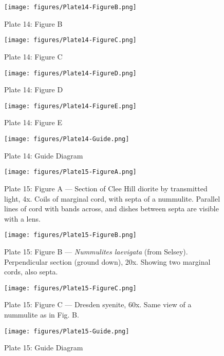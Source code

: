 \documentclass[a4paper, 12pt, oneside]{article}
\begin{document}
\clearpage
\begin{figure}[b]
\centering
\texttt{[image: figures/Plate14-FigureB.png]}
\caption{\small Plate 14: Figure B}
\end{figure}
\clearpage
\begin{figure}[b]
\centering
\texttt{[image: figures/Plate14-FigureC.png]}
\caption{\small Plate 14: Figure C}
\end{figure}
\clearpage
\begin{figure}[b]
\centering
\texttt{[image: figures/Plate14-FigureD.png]}
\caption{\small Plate 14: Figure D}
\end{figure}
\clearpage
\begin{figure}[b]
\centering
\texttt{[image: figures/Plate14-FigureE.png]}
\caption{\small Plate 14: Figure E}
\end{figure}
\clearpage
\begin{figure}[b]
\centering
\texttt{[image: figures/Plate14-Guide.png]}
\caption{\small Plate 14: Guide Diagram}
\end{figure}
\clearpage
{}
\cfoot{\thepage}
\begin{figure}[b]
\centering
\texttt{[image: figures/Plate15-FigureA.png]}
\caption{\small Plate 15: Figure A --- Section of Clee Hill diorite by transmitted light, 4x. Coils of marginal cord, with septa of a nummulite. Parallel lines of cord with bands across, and dishes between septa are visible with a lens.}
\end{figure}
\clearpage
\begin{figure}[b]
\centering
\texttt{[image: figures/Plate15-FigureB.png]}
\caption{\small Plate 15: Figure B --- \emph{Nummulites laevigata} (from Selsey). Perpendicular section (ground down), 20x. Showing two marginal cords, also septa.}
\end{figure}
\clearpage
\begin{figure}[b]
\centering
\texttt{[image: figures/Plate15-FigureC.png]}
\caption{\small Plate 15: Figure C --- Dresden syenite, 60x. Same view of a nummulite as in Fig. B.}
\end{figure}
\clearpage
\begin{figure}[b]
\centering
\texttt{[image: figures/Plate15-Guide.png]}
\caption{\small Plate 15: Guide Diagram}
\end{figure}
\end{document}
